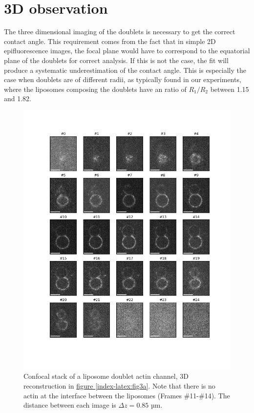 \documentclass[A4paperpaper,11pt,english]{sphinxmanual}
\begin{document}
\section{3D observation}
\label{index-latex:d-observation}\label{index-latex:d-obs}
The three dimensional imaging of the doublets is necessary to get the correct
contact angle. This requirement comes from the fact that in simple 2D epifluorescence
images, the focal plane would have to correspond to the equatorial plane of the doublets for correct analysis. If
this is not the case, the fit will produce a systematic underestimation of the contact angle.
This is especially the case when doublets are of different radii, as typically found in our
experiments, where the liposomes composing the doublets have an ratio of \(R_1 / R_2\) between 1.15 and 1.82.
\begin{figure}[htbp]
\centering
\capstart

\includegraphics[width=0.900\linewidth]{light_table.png}
\caption{Confocal stack of a liposome doublet actin channel, 3D reconstruction in
\hyperref[index-latex:fig3a]{figure  \ref*{index-latex:fig3a}}. Note that there is no actin at the interface between
the liposomes (Frames \#11-\#14). The distance between each image is \(\Delta z=0.85\) µm.}\label{index-latex:confocal-stack}\end{figure}
\end{document}
